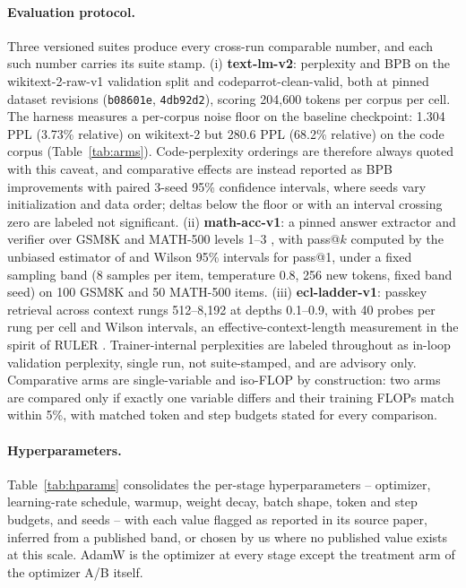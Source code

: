 \paragraph{Evaluation protocol.}
Three versioned suites produce every cross-run comparable number, and
each such number carries its suite stamp. (i) \textbf{text-lm-v2}:
perplexity and BPB on the wikitext-2-raw-v1 validation split and
codeparrot-clean-valid, both at pinned dataset revisions
(\texttt{b08601e}, \texttt{4db92d2}), scoring 204{,}600 tokens per
corpus per cell. The harness measures a per-corpus noise floor on the
baseline checkpoint: 1.304 PPL (3.73\% relative) on wikitext-2 but
280.6 PPL (68.2\% relative) on the code corpus (Table~\ref{tab:arms}).
Code-perplexity orderings are therefore always quoted with this caveat,
and comparative effects are instead reported as BPB improvements with
paired 3-seed 95\% confidence intervals, where seeds vary initialization
and data order; deltas below the floor or with an interval crossing zero
are labeled not significant. (ii) \textbf{math-acc-v1}: a pinned answer
extractor and verifier over GSM8K \citep{cobbe2021training} and MATH-500
levels 1--3 \citep{hendrycks2021measuring}, with pass@$k$ computed by
the unbiased estimator of \citet{chen2021evaluating} and Wilson 95\%
intervals for pass@1, under a fixed sampling band (8 samples per item,
temperature 0.8, 256 new tokens, fixed band seed) on 100 GSM8K and
50 MATH-500 items. (iii) \textbf{ecl-ladder-v1}: passkey retrieval
\citep{mohtashami2023landmark} across context rungs 512--8{,}192 at
depths 0.1--0.9, with 40 probes per rung per cell and Wilson intervals,
an effective-context-length measurement in the spirit of RULER
\citep{hsieh2024ruler}. Trainer-internal perplexities are labeled
throughout as in-loop validation perplexity, single run, not
suite-stamped, and are advisory only. Comparative arms are
single-variable and iso-FLOP by construction: two arms are compared only
if exactly one variable differs and their training FLOPs match within
5\%, with matched token and step budgets stated for every comparison.

\paragraph{Hyperparameters.}
Table~\ref{tab:hparams} consolidates the per-stage hyperparameters --
optimizer, learning-rate schedule, warmup, weight decay, batch shape,
token and step budgets, and seeds -- with each value flagged as reported
in its source paper, inferred from a published band, or chosen by us
where no published value exists at this scale. AdamW
\citep{loshchilov2017decoupled} is the optimizer at every stage except
the treatment arm of the optimizer A/B itself.


